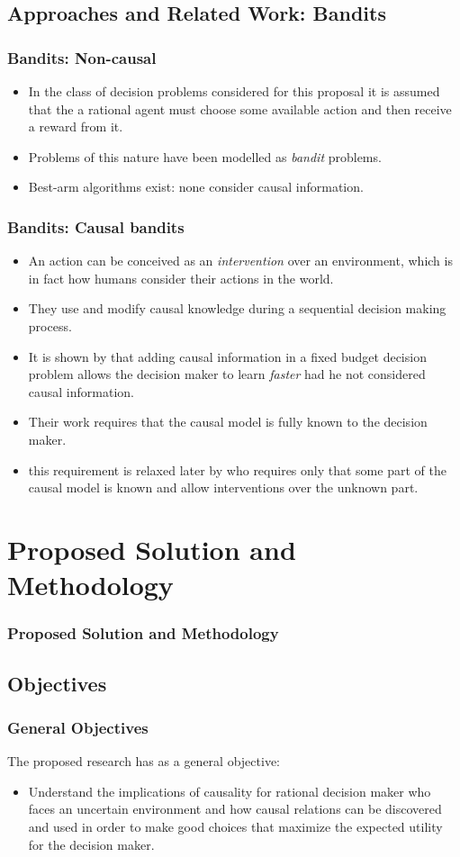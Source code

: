 \documentclass{beamer}
\theoremstyle{plain}
\begin{document}
\subsection{Approaches and Related Work: Bandits}
\begin{frame}
\frametitle{Bandits: Non-causal}
\begin{itemize}
\item In the class of decision problems considered for this proposal it is assumed that the a rational agent must choose some available action and then receive a reward from it.
\item Problems of this nature have been modelled as \textit{bandit} problems.
\item Best-arm algorithms exist: none consider causal information.
\end{itemize}
\end{frame}
\begin{frame}
\frametitle{Bandits: Causal bandits}
\begin{itemize}
\item An action can be conceived as an \textit{intervention} over an environment, which is in fact how humans consider their actions in the world.
\item They use and modify causal knowledge during a sequential decision making process.
\item It is shown by \cite{lattimoreNIPS2016} that adding causal information in a fixed budget decision problem allows the decision maker to learn \textit{faster} had he not considered causal information.
\item Their work requires that the causal model is fully known to the decision maker.
\item this requirement is relaxed later by \cite{sen2017identifying} who requires only that some part of the causal model is known and allow interventions over the unknown part. 
\end{itemize}
\end{frame}

\section{Proposed Solution and Methodology}
\begin{frame}
\frametitle{Proposed Solution and Methodology}
\end{frame}
	\subsection{Objectives}
	\begin{frame}
	\frametitle{General Objectives}
	The proposed research has as a general objective:
	\begin{itemize}
 \item Understand the implications of causality for rational decision maker who faces an uncertain environment and how causal relations can be discovered and used in order to make good choices that maximize the expected utility for the decision maker.
	\end{itemize}
	\end{frame}
	
\end{document}
